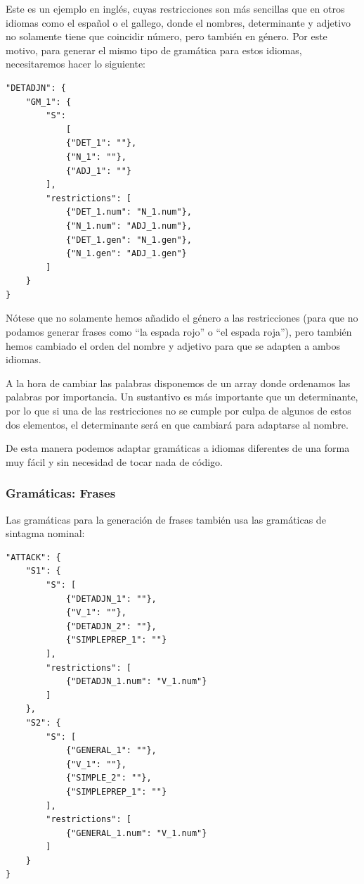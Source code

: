 Este es un ejemplo en inglés, cuyas restricciones son más sencillas que en otros idiomas como el español o el gallego, donde el nombres, determinante y adjetivo no solamente tiene que coincidir número, pero también en género. Por este motivo, para generar el mismo tipo de gramática para estos idiomas, necesitaremos hacer lo siguiente:

\begin{lstlisting}[style=json]
"DETADJN": {
    "GM_1": {
        "S": 
            [
            {"DET_1": ""},
            {"N_1": ""},
            {"ADJ_1": ""}
        ],
        "restrictions": [
            {"DET_1.num": "N_1.num"},
            {"N_1.num": "ADJ_1.num"},
            {"DET_1.gen": "N_1.gen"},
            {"N_1.gen": "ADJ_1.gen"}
        ]
    }
}
\end{lstlisting}

Nótese que no solamente hemos añadido el género a las restricciones (para que no podamos generar frases como ``la espada rojo'' o ``el espada roja''), pero también hemos cambiado el orden del nombre y adjetivo para que se adapten a ambos idiomas. 

A la hora de cambiar las palabras disponemos de un array donde ordenamos las palabras por importancia. Un sustantivo es más importante que un determinante, por lo que si una de las restricciones no se cumple por culpa de algunos de estos dos elementos, el determinante será en que cambiará para adaptarse al nombre.

De esta manera podemos adaptar gramáticas a idiomas diferentes de una forma muy fácil y sin necesidad de tocar nada de código.

\subsubsection{Gramáticas: Frases}

Las gramáticas para la generación de frases también usa las gramáticas de sintagma nominal: 

\begin{lstlisting}[style=json]
"ATTACK": {
	"S1": {
	    "S": [
	        {"DETADJN_1": ""},
	        {"V_1": ""},
	        {"DETADJN_2": ""},
	        {"SIMPLEPREP_1": ""}
	    ],
	    "restrictions": [
	        {"DETADJN_1.num": "V_1.num"}
	    ]
	},
	"S2": {
	    "S": [
	        {"GENERAL_1": ""},
	        {"V_1": ""},
	        {"SIMPLE_2": ""},
	        {"SIMPLEPREP_1": ""}
	    ],
	    "restrictions": [
	        {"GENERAL_1.num": "V_1.num"}
	    ]
	}
}
\end{lstlisting}

